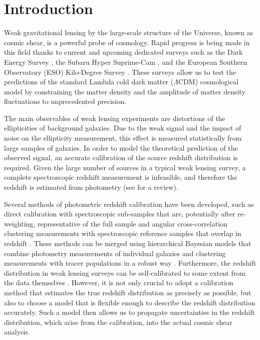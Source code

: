 \documentclass{aa}
\begin{document}


   \maketitle
%

\section{Introduction}
Weak gravitational lensing by the large-scale structure of the Universe, known as cosmic shear, is a powerful probe of cosmology. Rapid progress is being made in this field thanks to current and upcoming dedicated surveys such as the Dark Energy Survey \cite[DES; ][]{DES1, DES2, DES4, DES5}, the Subaru Hyper Suprime-Cam \cite[HSC; ][]{HSC1, HSC2}, and the European Southern Observatory (ESO) Kilo-Degree Survey \cite[KiDS; ][]{kuijken19, asgari20}. These surveys allow us to test the predictions of the standard Lambda cold dark matter ($\Lambda$CDM) cosmological model by constraining the matter density and the amplitude of matter density fluctuations to unprecedented precision. 

The main observables of weak lensing experiments are distortions of the ellipticities of background galaxies. Due to the weak signal and the impact of noise on the ellipticity measurement, this effect is measured statistically from large samples of galaxies. In order to model the theoretical prediction of the observed signal, an accurate calibration of the source redshift distribution is required. Given the large number of sources in a typical weak lensing survey, a complete spectroscopic redshift measurement is infeasible, and therefore the redshift is estimated from photometry (see \citealt{2019NatAs...3..212S} for a review). 

Several methods of photometric redshift calibration have been developed, such as direct calibration with spectroscopic sub-samples that are, potentially after re-weighting, representative of the full sample \citep{Lima, Bonnett, hildebrandt17} and angular cross-correlation clustering measurements with spectroscopic reference samples that overlap in redshift \cite[e.g.][]{Newman08,MatthewsNewman, Menard, mcleod17}. These methods can be merged using hierarchical Bayesian models that combine photometry measurements of individual galaxies and clustering measurements with tracer populations in a robust way \citep{sanchez,alarcon}. Furthermore, the redshift distribution in weak lensing surveys can be self-calibrated to some extent from the data themselves \citep{zhang10, CFHTLens, schaan20}. However, it is not only crucial to adopt a calibration method that estimates the true redshift distribution as precisely as possible, but also to choose a model that is flexible enough to describe the redshift distribution accurately. Such a model then allows us to propagate uncertainties in the redshift distribution, which arise from the calibration, into the actual cosmic shear analysis. 
 
\end{document}
